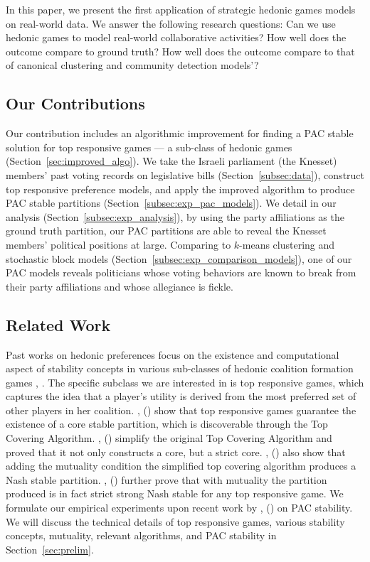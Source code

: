 \documentclass[letterpaper]{article} %
\newcommand{\citename}[1]{\citeauthor{#1}, (\citeyear{#1})}
\theoremstyle{definition}
\begin{document}
In this paper, we present the first application of strategic hedonic games models on real-world data. We answer the following research questions: Can we use hedonic games to model real-world collaborative activities? How well does the outcome compare to ground truth? How well does the outcome compare to that of canonical clustering and community detection models'?

\subsection{Our Contributions}\label{sec:contrib}
Our contribution includes an algorithmic improvement for finding a PAC stable solution for top responsive games --- a sub-class of hedonic games (Section~\ref{sec:improved_algo}). We take the Israeli parliament (the Knesset) members' past voting records on legislative bills (Section~\ref{subsec:data}), construct top responsive preference models, and apply the improved algorithm to produce PAC stable partitions (Section~\ref{subsec:exp_pac_models}). We detail in our analysis (Section~\ref{subsec:exp_analysis}), by using the party affiliations as the ground truth partition, our PAC partitions are able to reveal the Knesset members' political positions at large. Comparing to $k$-means clustering and stochastic block models (Section~\ref{subsec:exp_comparison_models}), one of our PAC models reveals politicians whose voting behaviors are known to break from their party affiliations and whose allegiance is fickle.

\subsection{Related Work}\label{sec:related}
Past works on hedonic preferences focus on the existence and computational aspect of stability concepts in various sub-classes of hedonic coalition formation games \cite{Aziz:2012:ESH:2343776.2343806}, \cite{aziz_savani_moulin_2016}. The specific subclass we are interested in is top responsive games, which captures the idea that a player's utility is derived from the most preferred set of other players in her coalition.
\citename{ALCALDE2004869} show that top responsive games guarantee the existence of a core stable partition, which is discoverable through the Top Covering Algorithm. \citename{DIMITROV2007130} simplify the original Top Covering Algorithm and proved that it not only constructs a core, but a strict core. \citename{Dimitrov2006TopRA} also show that adding the mutuality condition the simplified top covering algorithm produces a Nash stable partition. \citename{Aziz:2012:ESH:2343776.2343806} further prove that with mutuality the partition produced is in fact strict strong Nash stable for any top responsive game. We formulate our empirical experiments upon recent work by \citename{ijcai2017-380} on PAC stability. We will discuss the technical details of top responsive games, various stability concepts, mutuality, relevant algorithms, and PAC stability in Section~\ref{sec:prelim}.
\end{document}
